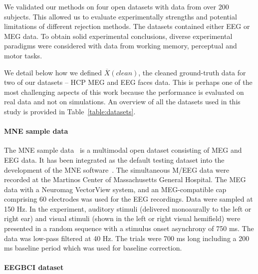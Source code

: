 We validated our methods on four open datasets with data from over 200 subjects. This allowed us to evaluate experimentally strengths and potential limitations of different rejection methods. The datasets contained either EEG or MEG data. To obtain solid experimental conclusions, diverse experimental paradigms were considered with data from working memory, perceptual and motor tasks.

We detail below how we defined $\overbar{X}(clean)$, the cleaned ground-truth data for two of our datasets -- HCP MEG and EEG faces data. This is perhaps one of the most challenging aspects of this work because the performance is evaluated on real data and not on simulations. An overview of all the datasets used in this study is provided in Table~\ref{table:datasets}.


\paragraph{MNE sample data}

The MNE sample data~\citep{gramfort2013meg} is a multimodal open dataset consisting of MEG and EEG data. It has been integrated as the default testing dataset into the development of the MNE software~\citep{gramfort2013meg}. The simultaneous M/EEG data were recorded at the Martinos Center of Massachusetts General Hospital. The MEG data with a Neuromag VectorView system, and an MEG-compatible cap comprising 60 electrodes was used for the EEG recordings. Data were sampled at 150 Hz. In the experiment, auditory stimuli (delivered monoaurally to the left or right ear) and visual stimuli (shown in the left or right visual hemifield) were presented in a random sequence with a stimulus onset asynchrony of 750 ms. The data was low-pass filtered at 40 Hz. The trials were 700 ms long including a 200 ms baseline period which was used for baseline correction.

\paragraph{EEGBCI dataset}

